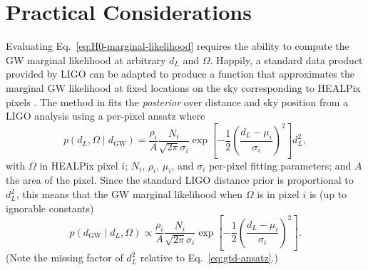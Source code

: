 \documentclass[modern]{article}
\newcommand{\dGW}{d_{\mathrm{GW}}}
\begin{document}
\section{Practical Considerations}

Evaluating Eq.\ \eqref{eq:H0-marginal-likelihood} requires the ability to
compute the \ac{GW} marginal likelihood at arbitrary $d_L$ and $\Omega$.
Happily, a standard data product provided by LIGO \cite{Singer2016} can be
adapted to produce a function that approximates the marginal \ac{GW} likelihood
at fixed locations on the sky corresponding to HEALPix pixels
\cite{Gorski2005}.  The method in \cite{Singer2016} fits the \emph{posterior}
over distance and sky position from a LIGO analysis using a per-pixel ansatz
where
%
\begin{equation}
    \label{eq:gtd-ansatz}
    p\left( d_L, \Omega \mid \dGW \right) = \frac{\rho_i}{A} \frac{N_i}{\sqrt{2\pi} \sigma_i} \exp\left[ -\frac{1}{2} \left(\frac{d_L-\mu_i}{\sigma_i}\right)^2 \right] d_L^2,
\end{equation}
%
with $\Omega$ in HEALPix pixel $i$; $N_i$, $\rho_i$, $\mu_i$, and $\sigma_i$
per-pixel fitting parameters; and $A$ the area of the pixel.  Since the standard
LIGO distance prior is proportional to $d_L^2$, this means that the \ac{GW}
marginal likelihood when $\Omega$ is in pixel $i$ is (up to ignorable constants)
%
\begin{equation}
    p\left( \dGW \mid d_L, \Omega \right) \propto \frac{\rho_i}{A} \frac{N_i}{\sqrt{2\pi} \sigma_i} \exp\left[ -\frac{1}{2} \left(\frac{d_L-\mu_i}{\sigma_i}\right)^2 \right].
\end{equation}
%
(Note the missing factor of $d_L^2$ relative to Eq.\ \eqref{eq:gtd-ansatz}.)
\end{document}
